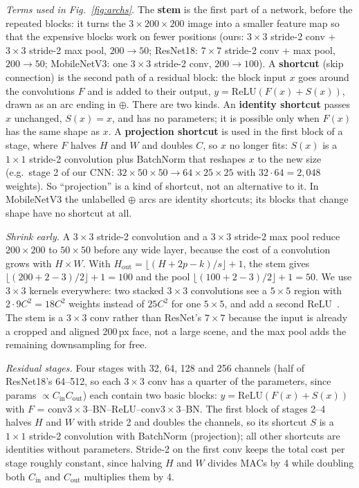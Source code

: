 \documentclass[conference,a4paper]{IEEEtran}
\begin{document}
\emph{Terms used in Fig.~\ref{fig:archs}.} The \textbf{stem} is the first part of a network, before the repeated blocks: it turns the $3\times200\times200$ image into a smaller feature map so that the expensive blocks work on fewer positions (ours: $3\times3$ stride-2 conv + $3\times3$ stride-2 max pool, $200\to50$; ResNet18: $7\times7$ stride-2 conv + max pool, $200\to50$; MobileNetV3: one $3\times3$ stride-2 conv, $200\to100$). A \textbf{shortcut} (skip connection) is the second path of a residual block: the block input $x$ goes around the convolutions $F$ and is added to their output, $y=\mathrm{ReLU}(F(x)+S(x))$, drawn as an arc ending in $\oplus$. There are two kinds. An \textbf{identity shortcut} passes $x$ unchanged, $S(x)=x$, and has no parameters; it is possible only when $F(x)$ has the same shape as $x$. A \textbf{projection shortcut} is used in the first block of a stage, where $F$ halves $H$ and $W$ and doubles $C$, so $x$ no longer fits: $S(x)$ is a $1\times1$ stride-2 convolution plus BatchNorm that reshapes $x$ to the new size (e.g.\ stage 2 of our CNN: $32\times50\times50\to64\times25\times25$ with $32\cdot64 = 2{,}048$ weights). So ``projection'' is a kind of shortcut, not an alternative to it. In MobileNetV3 the unlabelled $\oplus$ arcs are identity shortcuts; its blocks that change shape have no shortcut at all.

\emph{Shrink early.} A $3\times3$ stride-2 convolution and a $3\times3$ stride-2 max pool reduce $200\times200$ to $50\times50$ before any wide layer, because the cost of a convolution grows with $H\times W$. With $H_{\text{out}} = \lfloor (H + 2p - k)/s \rfloor + 1$, the stem gives $\lfloor(200+2-3)/2\rfloor+1 = 100$ and the pool $\lfloor(100+2-3)/2\rfloor+1 = 50$. We use $3\times3$ kernels everywhere: two stacked $3\times3$ convolutions see a $5\times5$ region with $2\cdot9C^2 = 18C^2$ weights instead of $25C^2$ for one $5\times5$, and add a second ReLU~\cite{simonyan2015vgg}. The stem is a $3\times3$ conv rather than ResNet's $7\times7$ because the input is already a cropped and aligned 200\,px face, not a large scene, and the max pool adds the remaining downsampling for free.

\emph{Residual stages.} Four stages with 32, 64, 128 and 256 channels (half of ResNet18's 64--512, so each $3\times3$ conv has a quarter of the parameters, since params $\propto C_{\text{in}}C_{\text{out}}$) each contain two basic blocks: $y = \mathrm{ReLU}(F(x) + S(x))$ with $F$ = conv$3\times3$--BN--ReLU--conv$3\times3$--BN. The first block of stages 2--4 halves $H$ and $W$ with stride 2 and doubles the channels, so its shortcut $S$ is a $1\times1$ stride-2 convolution with BatchNorm (projection); all other shortcuts are identities without parameters. Stride-2 on the first conv keeps the total cost per stage roughly constant, since halving $H$ and $W$ divides MACs by 4 while doubling both $C_{\text{in}}$ and $C_{\text{out}}$ multiplies them by 4.
\end{document}
